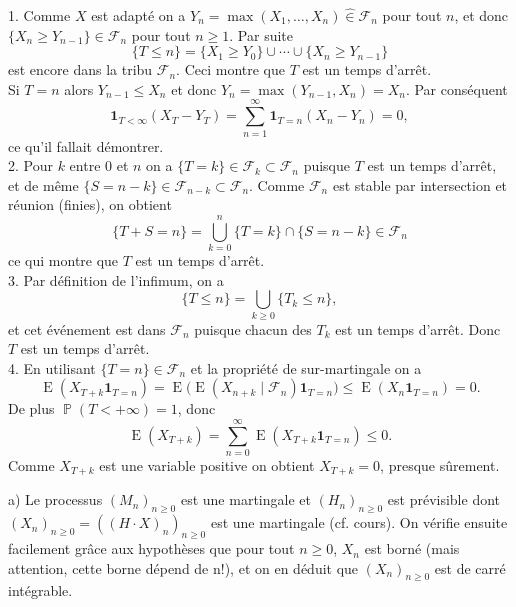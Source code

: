 \documentclass[a4, 12pt]{article}
\providecommand{\prob}{\mathop{\mathbb P{}}\nolimits}
\providecommand{\E}{\mathop{\mathrm{E}{}}\nolimits}
\providecommand{\E}{\mathop{\mathbb E{}}\nolimits}
\providecommand{\prob}{\mathop{\mathbb P{}}\nolimits}
\begin{document}
\vspace{1cm}
1. Comme $X$ est adapté on a $Y_n = \max ( X_1 , \dotsc , X_n ) \hat\in \mathcal F_n$ pour tout $n$, et donc 
$\{ X_n \geq Y_{n-1}\} \in \mathcal F_n$ pour tout $n\geq 1$. Par suite
\[ 
\{ T \leq n \} = \{ X_1 \geq Y_0\} \cup \dotsb \cup \{ X_n \geq Y_{n-1}  \} 
\]
est encore dans la tribu $\mathcal F_n$. Ceci montre que $T$ est un temps d'arrêt.
\\
Si $T = n$ alors $Y_{n-1}\leq X_n$ et donc $Y_n = \max ( Y_{n-1} , X_n ) = X_n$. Par conséquent
\[
\mathbf{1}_{T < \infty} ( X_T - Y_T ) = \sum_{n=1}^\infty \mathbf{1}_{T=n} ( X_n  - Y_n ) = 0 ,
\]
ce qu'il fallait démontrer. 
\\
2. 
Pour $k$ entre $0$ et $n$ on a $\{ T = k \} \in \mathcal F_k \subset \mathcal F_n$ puisque $T$ est un temps d'arrêt, et de même $\{S= n-k\} \in \mathcal F_{n-k} \subset \mathcal F_n$. Comme $\mathcal F_n$ est stable par intersection et réunion (finies), on obtient
\[
\{ T+S  = n \} = \bigcup_{k=0}^n \{ T=k \} \cap \{ S = n-k\} \in \mathcal F_n
\]
ce qui montre que $T$ est un temps d'arrêt. 
\\
3. Par définition de l'infimum, on a
\[
 \{ T \leq n \} = \bigcup_{k\geq 0} \{ T_k \leq n \} ,
 \]
 et cet événement est dans $\mathcal F_n$ puisque chacun des $T_k$ est un temps d'arrêt. 
 Donc $T$ est un temps d'arrêt.
 \\
 4.
En utilisant $\{T=n\}\in\mathcal F_n$ et la propriété de sur-martingale on a
\[ \E ( X_{T+k} \mathbf{1}_{T=n} )  = \E \bigl(  \E ( X_{n+k} \mid \mathcal F_n )  \mathbf{1}_{ T=n } )
 \leq \E ( X_n  \mathbf{1}_{T=n} ) = 0 . \]
De plus $\prob( T < +\infty ) =1$, donc
 \[ 
 \E ( X_{T+k} ) = \sum_{n=0}^\infty \E ( X_{T+k} \mathbf{1}_{T=n} ) \leq 0 .
 \]
Comme $X_{T+k}$ est une variable positive on obtient $X_{T+k} = 0$, presque sûrement.


\bigskip

\vspace{1cm}
 a) Le processus $(M_n)_{n\geq 0}$ est une martingale et $(H_n)_{n\geq 0}$ est prévisible dont $(X_n)_{n\geq 0}=((H\cdot X)_n)_{n\geq 0}$ est une martingale (cf. cours). On vérifie ensuite facilement grâce aux hypothèses que pour tout $n\geq 0$, $X_n$ est borné (mais attention, cette borne dépend de n!), et on en déduit que  $(X_n)_{n\geq 0}$ est de carré intégrable.\\
\end{document}
